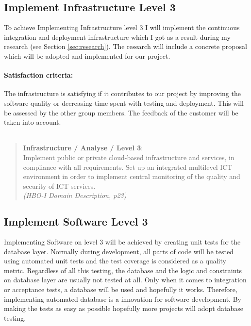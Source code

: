 \subsection{Implement Infrastructure Level 3}
\label{ii3}

To achieve Implementing Infrastructure level 3 I will implement the continuous integration and deployment infrastructure which I got as a result during my research (see Section \ref{sec:research}).
The research will include a concrete proposal which will be adopted and implemented for our project.

\paragraph{Satisfaction criteria:} The infrastructure is satisfying if it contributes to our project by improving the software quality or decreasing time spent with testing and deployment. This will be assessed by the other group members. The feedback of the customer will be taken into account.
~\\~\\
\begin{minipage}{\textwidth}
\begin{quote}
	\textbf{Infrastructure / Analyse / Level 3}: \\
	Implement public or private cloud-based infrastructure and services, in compliance with all requirements. 
	Set up an integrated multilevel ICT environment in order to implement central monitoring of the quality and security of ICT services.
	\\ \textit{(HBO-I Domain Description, p23)}
\end{quote}
\end{minipage}


\subsection{Implement Software Level 3}

Implementing Software on level 3 will be achieved by creating unit tests for the database layer.
Normally during development, all parts of code will be tested using automated unit tests and the test coverage is considered as a quality metric. 
Regardless of all this testing, the database and the logic and constraints on database layer are usually not tested at all.
Only when it comes to integration or acceptance tests, a database will be used and hopefully it works. Therefore, implementing automated database is a innovation for software development. By making the tests as easy as possible hopefully more projects will adopt database testing.

